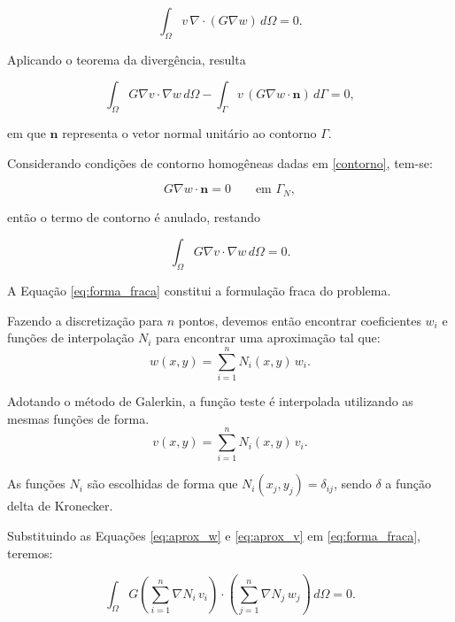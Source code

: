 \documentclass[brazil]{TCAM} %
\begin{document}
\begin{equation*}
\int_{\Omega} v \, \nabla \cdot (G \nabla w)\, d\Omega = 0.
\end{equation*}

Aplicando o teorema da divergência, resulta

\begin{equation*}
\int_{\Omega} G \nabla v \cdot \nabla w \, d\Omega
-
\int_{\Gamma}
v \, (G\nabla w \cdot \mathbf{n})
\, d\Gamma
=
0,
\end{equation*}

em que $\mathbf{n}$ representa o vetor normal unitário ao contorno $\Gamma$.

Considerando condições de contorno  homogêneas dadas em \eqref{contorno}, tem-se:

\begin{equation*}
G\nabla w \cdot \mathbf{n}=0
\qquad \text{em } \Gamma_N,
\end{equation*}

então o termo de contorno é anulado, restando

\begin{equation}
\int_{\Omega}
G \nabla v \cdot \nabla w
\, d\Omega
=
0.
\label{eq:forma_fraca}
\end{equation}

A Equação \eqref{eq:forma_fraca} constitui a formulação fraca do problema.

Fazendo a discretização para $n$ pontos, devemos então encontrar coeficientes $w_i$ e funções de interpolação $N_i$ para encontrar uma aproximação tal que:
\begin{equation}
    w(x,y)
=
\sum_{i=1}^{n}
N_i(x,y)\, w_i.
\label{eq:aprox_w}
\end{equation}

 Adotando o método de Galerkin, a função teste é interpolada utilizando as mesmas funções de forma.
\begin{equation}
v(x,y)
=
\sum_{i=1}^{n}
N_i(x,y)\, v_i.
\label{eq:aprox_v}
\end{equation}

As funções $N_i$ são escolhidas de forma que $N_i(x_j,y_j)=\delta_{ij}$, sendo $\delta$ a função delta de Kronecker.

Substituindo as Equações \eqref{eq:aprox_w} e \eqref{eq:aprox_v}
em \eqref{eq:forma_fraca}, teremos:

\begin{equation*}
    \int_{\Omega}
G
\left(
\sum_{i=1}^{n}
\nabla N_i\, v_i
\right)
\cdot
\left(
\sum_{j=1}^{n}
\nabla N_j\, w_j
\right)
\, d\Omega
=0.
\end{equation*}
\end{document}
